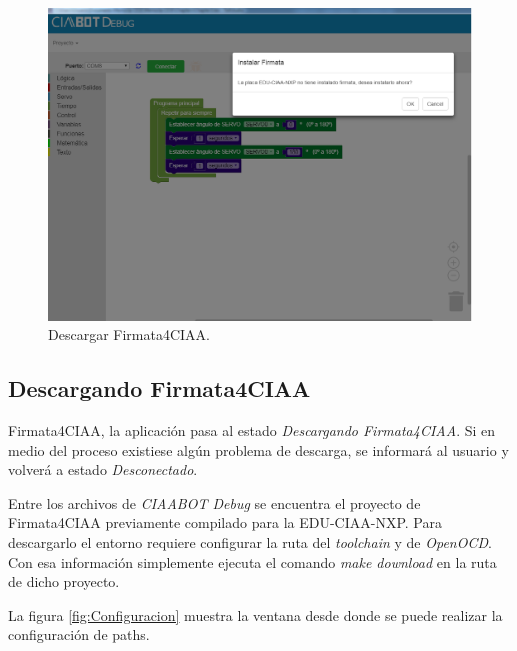 \begin{figure}[!htbp]
	\begin{center}  %
		\includegraphics*[width=15cm]{./Figures/instalar-firmata.png}
		\par\caption{Descargar Firmata4CIAA.}\label{fig:instalar-firmata}
	\end{center}
\end{figure}

\subsection{Descargando Firmata4CIAA}
\label{subsec:Descargando Firmata4CIAA}

Firmata4CIAA, la aplicación pasa al estado \emph{Descargando Firmata4CIAA}. Si en medio del proceso existiese algún problema de descarga, se informará al usuario y volverá a estado \emph{Desconectado}.

Entre los archivos de \emph{CIAABOT Debug} se encuentra el proyecto de Firmata4CIAA previamente compilado para la EDU-CIAA-NXP. Para descargarlo el entorno requiere configurar la ruta del \emph{toolchain} y de \emph{OpenOCD}. Con esa información simplemente ejecuta el comando \emph{make download} en la ruta de dicho proyecto.

La figura \ref{fig:Configuracion} muestra la ventana desde donde se puede realizar la configuración de paths.

